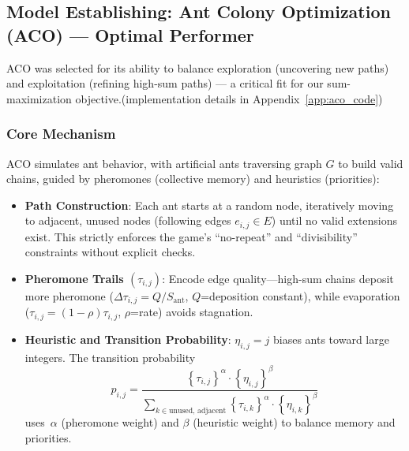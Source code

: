 \documentclass[twocolumn, a4paper]{article}
\begin{document}
\subsection{Model Establishing: Ant Colony Optimization (ACO) --- Optimal Performer}
ACO was selected for its ability to balance exploration (uncovering new paths) and exploitation (refining high-sum paths) --- a critical fit for our sum-maximization objective.(implementation details in Appendix~\ref{app:aco_code})
\subsubsection{Core Mechanism}
ACO simulates ant behavior, with artificial ants traversing graph $G$ to build valid chains, guided by pheromones (collective memory) and heuristics (priorities):
\begin{itemize}
    \item \textbf{Path Construction}: Each ant starts at a random node, iteratively moving to adjacent, unused nodes (following edges $e_{i,j} \in E$) until no valid extensions exist. This strictly enforces the game's ``no-repeat'' and ``divisibility'' constraints without explicit checks.
    \item \textbf{Pheromone Trails $(\tau_{i,j})$}: Encode edge quality—high-sum chains deposit more pheromone (\(\Delta \tau_{i,j}=Q/S_{\text{ant}}\), $Q$=deposition constant), while evaporation (\(\tau_{i,j}=(1-\rho)\tau_{i,j}\), \(\rho\)=rate) avoids stagnation.
    \item \textbf{Heuristic and Transition Probability}: $\eta_{i,j}=j$ biases ants toward large integers. The transition probability \[p_{i,j} = \frac{ \left\{ \tau_{i,j} \right\} ^{\alpha} \cdot \left\{ \eta_{i,j} \right\} ^{\beta} }{ \sum_{k \in \text{unused, adjacent}} \left\{ \tau_{i,k} \right\} ^{\alpha} \cdot \left\{ \eta_{i,k} \right\} ^{\beta} }\] uses $\alpha$ (pheromone weight) and $\beta$ (heuristic weight) to balance memory and priorities.
\end{itemize}
\end{document}
